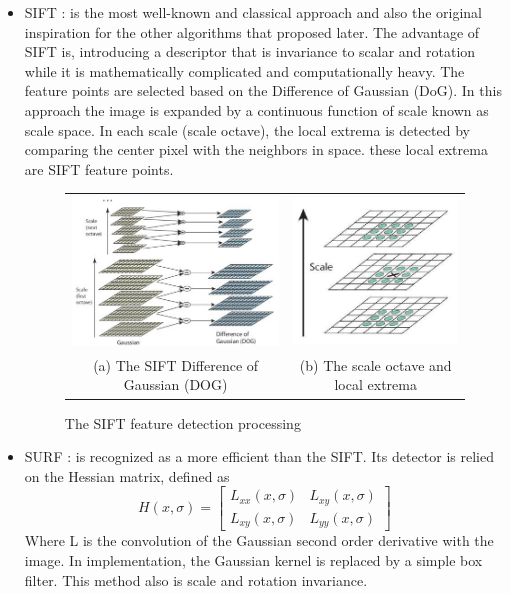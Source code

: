 \begin{itemize}
\item SIFT \cite{lowe2004distinctive}: is the most well-known and classical approach and also the original inspiration for the other algorithms that proposed later. The advantage of SIFT is, introducing a descriptor that is invariance to scalar and rotation while it is mathematically complicated and computationally heavy. The feature points are selected based on the Difference of Gaussian (DoG). In this approach the image is expanded by a continuous function of scale known as scale space. In each scale (scale octave), the local extrema is detected by comparing the center pixel with the neighbors in space. these local extrema are SIFT feature points.

\begin{figure}[H]
\begin{tabular}{cc}
  \includegraphics[width=80mm]{figures/sift_dog} &  \includegraphics[width=60mm]{figures/sift_scale} \\
(a) The SIFT Difference of Gaussian (DOG) & (b) The scale octave and local extrema \\[6pt]
\end{tabular}
\caption{The SIFT feature detection processing}   \label{fig:sift_detector}
\end{figure}


\item SURF \cite{bay2006surf}: is recognized as a more efficient than the SIFT. Its detector is relied on the Hessian matrix, defined as 
\begin{equation} \label{eq:hessian_matrix}
H(x,\sigma) = \begin{bmatrix}L_{xx}(x,\sigma) & L_{xy}(x,\sigma) \\L_{xy}(x,\sigma) & L_{yy}(x,\sigma) \end{bmatrix}
\end{equation}
Where L is the convolution of the Gaussian second order derivative with the image. In implementation, the Gaussian kernel is replaced by a simple box filter. This method also is scale and rotation invariance.
 

\end{itemize}
